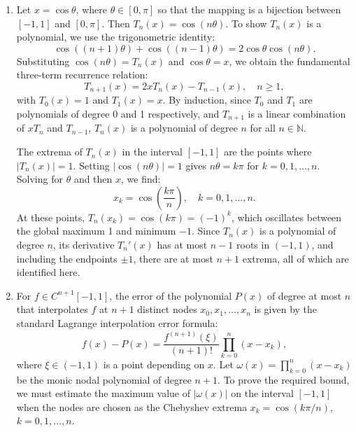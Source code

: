 \begin{solution}
\begin{enumerate}
\item[(a)] Let $x = \cos \theta$, where $\theta \in [0, \pi]$ so that the mapping is a bijection between $[-1, 1]$ and $[0, \pi]$. Then $T_n(x) = \cos(n\theta)$. To show $T_n(x)$ is a polynomial, we use the trigonometric identity:
\[
\cos((n+1)\theta) + \cos((n-1)\theta) = 2\cos \theta \cos(n\theta).
\]
Substituting $\cos(n\theta) = T_n(x)$ and $\cos \theta = x$, we obtain the fundamental three-term recurrence relation:
\[
T_{n+1}(x) = 2x T_n(x) - T_{n-1}(x), \quad n \geq 1,
\]
with $T_0(x) = 1$ and $T_1(x) = x$. By induction, since $T_0$ and $T_1$ are polynomials of degree 0 and 1 respectively, and $T_{n+1}$ is a linear combination of $x T_n$ and $T_{n-1}$, $T_n(x)$ is a polynomial of degree $n$ for all $n \in \mathbb{N}$.


The extrema of $T_n(x)$ in the interval $[-1, 1]$ are the points where $|T_n(x)| = 1$. Setting $|\cos(n\theta)| = 1$ gives $n\theta = k\pi$ for $k = 0, 1, \dots, n$. Solving for $\theta$ and then $x$, we find:
\[
x_k = \cos\left(\frac{k\pi}{n}\right), \quad k = 0, 1, \dots, n.
\]
At these points, $T_n(x_k) = \cos(k\pi) = (-1)^k$, which oscillates between the global maximum 1 and minimum $-1$. Since $T_n(x)$ is a polynomial of degree $n$, its derivative $T_n'(x)$ has at most $n-1$ roots in $(-1, 1)$, and including the endpoints $\pm 1$, there are at most $n+1$ extrema, all of which are identified here.

\item[(b)] For $f \in C^{n+1}[-1, 1]$, the error of the polynomial $P(x)$ of degree at most $n$ that interpolates $f$ at $n+1$ distinct nodes $x_0, x_1, \dots, x_n$ is given by the standard Lagrange interpolation error formula:
\[
f(x) - P(x) = \frac{f^{(n+1)}(\xi)}{(n+1)!} \prod_{k=0}^n (x - x_k),
\]
where $\xi \in (-1, 1)$ is a point depending on $x$. Let $\omega(x) = \prod_{k=0}^n (x - x_k)$ be the monic nodal polynomial of degree $n+1$. To prove the required bound, we must estimate the maximum value of $|\omega(x)|$ on the interval $[-1, 1]$ when the nodes are chosen as the Chebyshev extrema $x_k = \cos(k\pi/n)$, $k=0, 1, \dots, n$.


\end{enumerate}
\end{solution}

